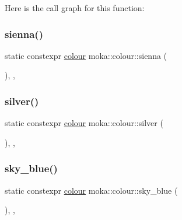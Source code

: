 Here is the call graph for this function\+:
\mbox{\label{classmoka_1_1colour_a016b25dff498d7fd2b8bbc8c4695a751}} 
\subsubsection{\texorpdfstring{sienna()}{sienna()}}
{\footnotesize\ttfamily static constexpr \mbox{\hyperlink{classmoka_1_1colour}{colour}} moka\+::colour\+::sienna (\begin{DoxyParamCaption}{ }\end{DoxyParamCaption})\hspace{0.3cm}{\ttfamily [inline]}, {\ttfamily [static]}, {\ttfamily [noexcept]}}

\mbox{\label{classmoka_1_1colour_a23dce8ee8b640ba4865b3dcda926c555}} 
\subsubsection{\texorpdfstring{silver()}{silver()}}
{\footnotesize\ttfamily static constexpr \mbox{\hyperlink{classmoka_1_1colour}{colour}} moka\+::colour\+::silver (\begin{DoxyParamCaption}{ }\end{DoxyParamCaption})\hspace{0.3cm}{\ttfamily [inline]}, {\ttfamily [static]}, {\ttfamily [noexcept]}}

\mbox{\label{classmoka_1_1colour_af2fda876258bf121bb2a833be220c73b}} 
\subsubsection{\texorpdfstring{sky\_blue()}{sky\_blue()}}
{\footnotesize\ttfamily static constexpr \mbox{\hyperlink{classmoka_1_1colour}{colour}} moka\+::colour\+::sky\+\_\+blue (\begin{DoxyParamCaption}{ }\end{DoxyParamCaption})\hspace{0.3cm}{\ttfamily [inline]}, {\ttfamily [static]}, {\ttfamily [noexcept]}}

